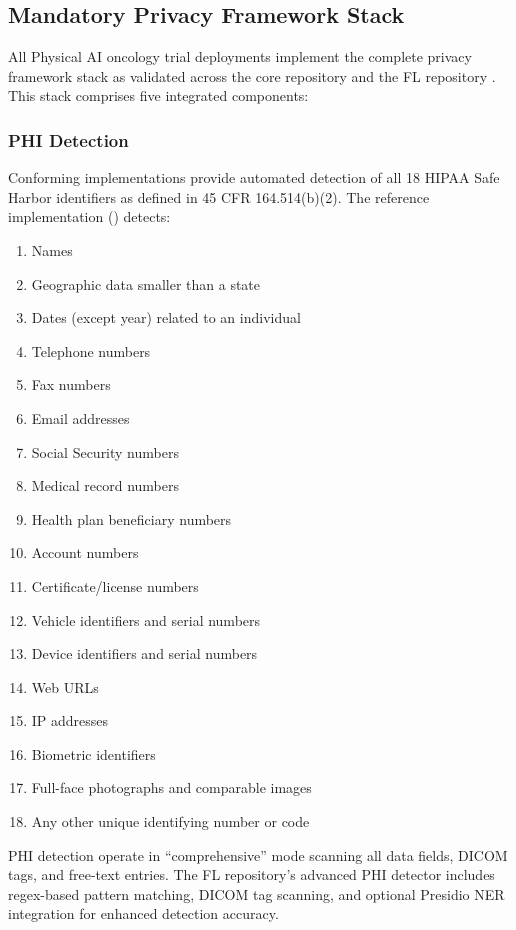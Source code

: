 \documentclass[11pt,letterpaper]{article}
\begin{document}
\subsection{Mandatory Privacy Framework Stack}

All Physical AI oncology trial deployments \SHALL{} implement the complete privacy framework stack as validated across the core repository and the FL repository \cite{kawchak2026fl}. This stack comprises five integrated components:

\subsubsection{PHI Detection}

Conforming implementations \SHALL{} provide automated detection of all 18 HIPAA Safe Harbor identifiers as defined in 45 CFR 164.514(b)(2). The reference implementation () detects:

\begin{enumerate}
  \setcounter{enumi}{0}
  \item Names
  \item Geographic data smaller than a state
  \item Dates (except year) related to an individual
  \item Telephone numbers
  \item Fax numbers
  \item Email addresses
  \item Social Security numbers
  \item Medical record numbers
  \item Health plan beneficiary numbers
  \item Account numbers
  \item Certificate/license numbers
  \item Vehicle identifiers and serial numbers
  \item Device identifiers and serial numbers
  \item Web URLs
  \item IP addresses
  \item Biometric identifiers
  \item Full-face photographs and comparable images
  \item Any other unique identifying number or code
\end{enumerate}

PHI detection \SHALL{} operate in ``comprehensive'' mode scanning all data fields, DICOM tags, and free-text entries. The FL repository's advanced PHI detector includes regex-based pattern matching, DICOM tag scanning, and optional Presidio NER integration for enhanced detection accuracy.
\end{document}
